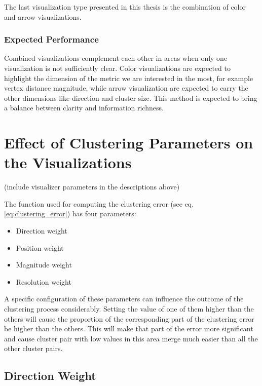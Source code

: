 The last visualization type presented in this thesis is the combination of color and arrow visualizations.

\subsubsection{Expected Performance}

Combined visualizations complement each other in areas when only one visualization is not sufficiently clear. Color visualizations are expected to highlight the dimension of the metric we are interested in the most, for example vertex distance magnitude, while arrow visualization are expected to carry the other dimensions like direction and cluster size. This method is expected to bring a balance between clarity and information richness.
\section{Effect of Clustering Parameters on the Visualizations}

(include visualizer parameters in the descriptions above)

The function used for computing the clustering error (see eq. \ref{eq:clustering_error}) has four parameters:

\begin{itemize}
\item Direction weight
\item Position weight
\item Magnitude weight
\item Resolution weight
\end{itemize}

A specific configuration of these parameters can influence the outcome of the clustering process considerably. Setting the value of one of them higher than the others will cause the proportion of the corresponding part of the clustering error be higher than the others. This will make that part of the error more significant and cause cluster pair with low values in this area merge much easier than all the other cluster pairs.

\subsection{Direction Weight}

